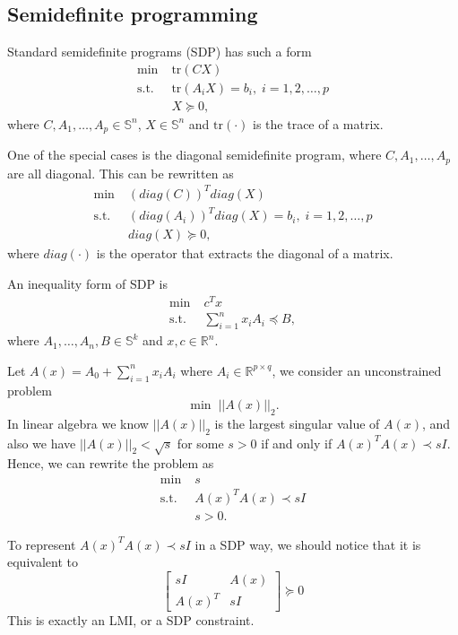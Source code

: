 \documentclass[lang=en,color=blue,mode=fancy,titlestyle=hang]{elegantbook}
\begin{document}
\subsection{Semidefinite programming}
Standard semidefinite programs (SDP) has such a form
\begin{align*}
\min \; &\text{tr}(C X)\\
\text{s.t.} \; &\text{tr}(A_i X) = b_i, \; i = 1, 2, \ldots, p\\
&X \succeq 0,
\end{align*}
where $C, A_1, \ldots, A_p \in \mathbb{S}^n$, $X \in \mathbb{S}^n$ and $\text{tr}(\cdot)$
is the trace of a matrix.

One of the special cases is the diagonal semidefinite program, where $C, A_1, \ldots, A_p$
are all diagonal. This can be rewritten as
\begin{align*}
\min \; &(diag(C))^T diag(X)\\
\text{s.t.} \; &(diag(A_i))^T diag(X) = b_i, \; i = 1, 2, \ldots, p\\
&diag(X) \succeq 0,
\end{align*}
where $diag(\cdot)$ is the operator that extracts the diagonal of a matrix.

An inequality form of SDP is
\begin{align*}
\min \; &c^T x\\
\text{s.t.} \; &\sum_{i=1}^n x_i A_i \preceq B,
\end{align*}
where $A_1, \ldots, A_n, B \in \mathbb{S}^k$ and $x, c \in \mathbb{R}^n$.

Let $A(x) = A_0 +\sum_{i=1}^n x_i A_i$ where $A_i \in \mathbb{R}^{p \times q}$, we consider
an unconstrained problem
\[
\min \; ||A(x)||_2.
\]
In linear algebra we know $||A(x)||_2$ is the largest singular value of $A(x)$, and also
we have $||A(x)||_2 < \sqrt{s}$ for some $s > 0$ if and only if $A(x)^T A(x) \prec s I$.
Hence, we can rewrite the problem as
\begin{align*}
\min \; &s\\
\text{s.t.} \; &A(x)^T A(x) \prec s I\\
&s > 0.
\end{align*}

To represent $A(x)^T A(x) \prec s I$ in a SDP way, we should notice that it is equivalent to
\[
\begin{bmatrix}
s I & A(x)\\
A(x)^T & s I
\end{bmatrix} \succeq 0
\]
This is exactly an LMI, or a SDP constraint.
\end{document}
